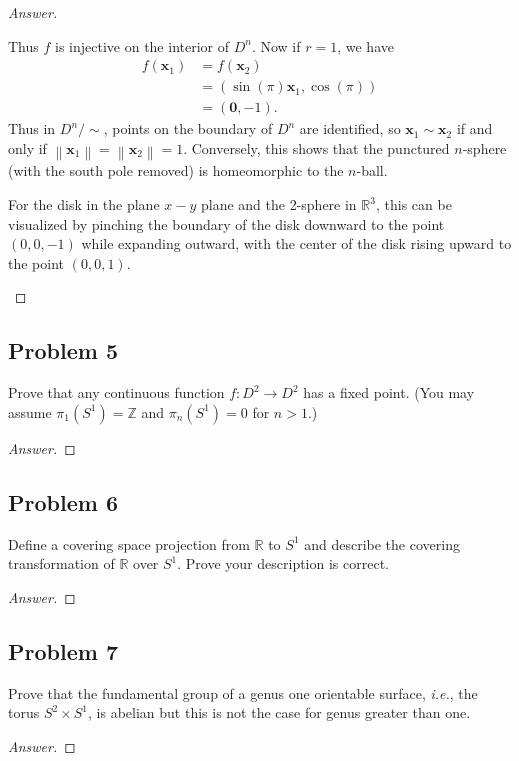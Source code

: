 \documentclass[12pt]{article}
\newcommand{\z}{\mathbb{Z}}
\newcommand{\real}{\mathbb{R}}
\newcommand{\ita}[1]{\textit{#1}}
\newcommand\paren[1]{\left( #1 \right)}
\newcommand{\norm}[1]{\left \| #1 \right \|}
\theoremstyle{definition}
\begin{document}
\begin{proof}[Answer]
\begin{enumerate}[(a)]
        Thus $f$ is injective on the interior of $D^n$. Now if $r = 1$, we have 
        \begin{align*}
            f \paren{ \mathbf{x}_1 } & = f \paren{ \mathbf{x}_2 } \\
            & = \paren{ \sin(\pi) \mathbf{x}_1 , \cos(\pi) } \\
            & = \paren{ \mathbf{0} , -1 }.
        \end{align*}
        Thus in $D^n / \sim$, points on the boundary of $D^n$ are identified, so $\mathbf{x}_1 \sim \mathbf{x}_2$ if and only if $\norm{ \mathbf{x}_1 } = \norm{ \mathbf{x}_2 } = 1$. Conversely, this shows that the punctured $n$-sphere (with the south pole removed) is homeomorphic to the $n$-ball.
        
        For the disk in the plane $x-y$ plane and the 2-sphere in $\real^3$, this can be visualized by pinching the boundary of the disk downward to the point $(0,0,-1)$ while expanding outward, with the center of the disk rising upward to the point $(0,0,1)$.
    \end{enumerate}
\end{proof}
\subsection{Problem 5}
Prove that any continuous function $f : D^2 \to D^2$ has a fixed point. (You may assume $\pi_1(S^1) = \z$ and $\pi_n(S^1) = 0$ for $n > 1$.)
\begin{proof}[Answer]

\end{proof}
\subsection{Problem 6}
Define a covering space projection from $\real$ to $S^1$ and describe the covering transformation of $\real$ over $S^1$. Prove your description is correct.
\begin{proof}[Answer]

\end{proof}
\subsection{Problem 7}
Prove that the fundamental group of a genus one orientable surface, \ita{i.e.}, the torus $S^2 \times S^1$, is abelian but this is not the case for genus greater than one.
\begin{proof}[Answer]

\end{proof}
\end{document}
